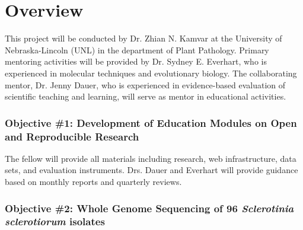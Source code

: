 \documentclass[12pt,letterpaper]{article}
\title{\ruleline{Management Plan}}
\begin{document}
\maketitle



\section{Overview}

This project will be conducted by Dr. Zhian N. Kamvar at the University of Nebraska-Lincoln (UNL) in the department of Plant Pathology. 
Primary mentoring activities will be provided by Dr. Sydney E. Everhart, who is experienced in molecular techniques and evolutionary biology. 
The collaborating mentor, Dr. Jenny Dauer, who is experienced in evidence-based evaluation of scientific teaching and learning, will serve as mentor in educational activities.


\subsubsection*{Objective \#1: Development of Education Modules on Open and Reproducible Research}

The fellow will provide all materials including research, web infrastructure, data sets, and evaluation instruments. 
Drs. Dauer and Everhart will provide guidance based on monthly reports and quarterly reviews.

\subsubsection*{Objective \#2: Whole Genome Sequencing of 96 \textit{Sclerotinia sclerotiorum} isolates}
\end{document}
